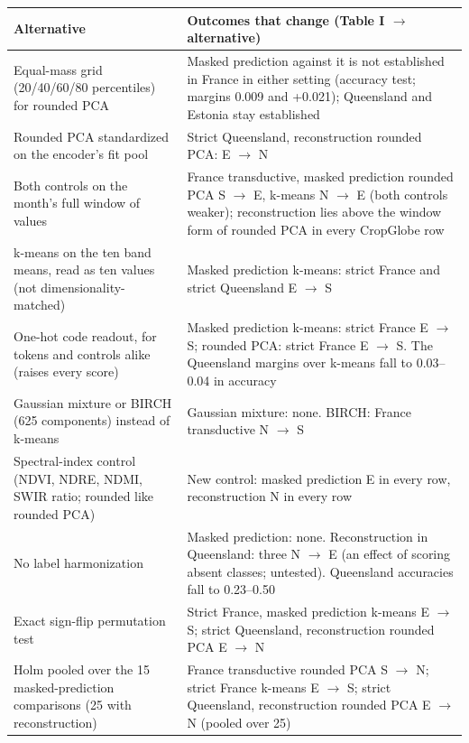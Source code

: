 \documentclass[10pt]{article}
\begin{document}
{\footnotesize
\begin{xltabular}{\linewidth}{@{}XX@{}}
\toprule
Alternative & Outcomes that change (Table I $\rightarrow$ alternative) \\
\midrule
\endhead
Equal-mass grid (20/40/60/80 percentiles) for rounded PCA & Masked prediction against it is not established in France in either setting (accuracy test; margins \textminus{}0.009 and +0.021); Queensland and Estonia stay established \\
Rounded PCA standardized on the encoder's fit pool & Strict Queensland, reconstruction \textminus{} rounded PCA: E $\rightarrow$ N \\
Both controls on the month's full window of values & France transductive, masked prediction \textminus{} rounded PCA S $\rightarrow$ E, \textminus{} k-means N $\rightarrow$ E (both controls weaker); reconstruction lies above the window form of rounded PCA in every CropGlobe row \\
k-means on the ten band means, read as ten values (not dimensionality-matched) & Masked prediction \textminus{} k-means: strict France and strict Queensland E $\rightarrow$ S \\
One-hot code readout, for tokens and controls alike (raises every score) & Masked prediction \textminus{} k-means: strict France E $\rightarrow$ S; \textminus{} rounded PCA: strict France E $\rightarrow$ S. The Queensland margins over k-means fall to 0.03--0.04 in accuracy \\
Gaussian mixture or BIRCH (625 components) instead of k-means & Gaussian mixture: none. BIRCH: France transductive N $\rightarrow$ S \\
Spectral-index control (NDVI, NDRE, NDMI, SWIR ratio; rounded like rounded PCA) & New control: masked prediction E in every row, reconstruction N in every row \\
No label harmonization & Masked prediction: none. Reconstruction in Queensland: three N $\rightarrow$ E (an effect of scoring absent classes; untested). Queensland accuracies fall to 0.23--0.50 \\
Exact sign-flip permutation test & Strict France, masked prediction \textminus{} k-means E $\rightarrow$ S; strict Queensland, reconstruction \textminus{} rounded PCA E $\rightarrow$ N \\
Holm pooled over the 15 masked-prediction comparisons (25 with reconstruction) & France transductive \textminus{} rounded PCA S $\rightarrow$ N; strict France \textminus{} k-means E $\rightarrow$ S; strict Queensland, reconstruction \textminus{} rounded PCA E $\rightarrow$ N (pooled over 25) \\

\end{xltabular}}
\end{document}
